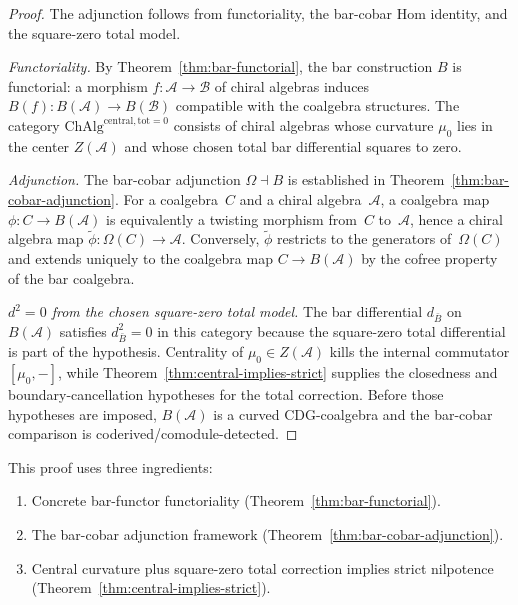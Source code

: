 \begin{proof}
The adjunction follows from functoriality, the bar-cobar Hom identity,
and the square-zero total model.

\emph{Functoriality.}
By Theorem~\ref{thm:bar-functorial}, the bar construction $B$ is functorial: a morphism $f: \mathcal{A} \to \mathcal{B}$ of chiral algebras induces $B(f): B(\mathcal{A}) \to B(\mathcal{B})$ compatible with the coalgebra structures. The category $\mathrm{ChAlg}^{\mathrm{central,tot=0}}$ consists of chiral algebras whose curvature $\mu_0$ lies in the center $Z(\mathcal{A})$ and whose chosen total bar differential squares to zero.

\emph{Adjunction.}
The bar-cobar adjunction $\Omega \dashv B$ is established in
Theorem~\ref{thm:bar-cobar-adjunction}. For a coalgebra~$C$ and a
chiral algebra~$\mathcal{A}$, a coalgebra map
$\phi\colon C \to B(\mathcal{A})$ is equivalently a twisting morphism
from~$C$ to~$\mathcal{A}$, hence a chiral algebra map
$\tilde{\phi}\colon \Omega(C) \to \mathcal{A}$. Conversely,
$\tilde{\phi}$ restricts to the generators of~$\Omega(C)$ and extends
uniquely to the coalgebra map $C \to B(\mathcal{A})$ by the cofree
property of the bar coalgebra.

\emph{$d^2 = 0$ from the chosen square-zero total model.}
The bar differential $d_{\bar{B}}$ on $B(\mathcal{A})$ satisfies
$d_{\bar{B}}^2 = 0$ in this category because the square-zero total
differential is part of the hypothesis. Centrality of
$\mu_0 \in Z(\mathcal{A})$ kills the internal commutator
$[\mu_0,-]$, while Theorem~\ref{thm:central-implies-strict} supplies
the closedness and boundary-cancellation hypotheses for the total
correction. Before those hypotheses are imposed, $B(\mathcal{A})$ is
a curved CDG-coalgebra and the bar-cobar comparison is
coderived/comodule-detected.
\end{proof}

\begin{remark}[Dependencies]
This proof uses three ingredients:
\begin{enumerate}[label=(D\arabic*)]
\item Concrete bar-functor functoriality (Theorem~\ref{thm:bar-functorial}).
\item The bar-cobar adjunction framework (Theorem~\ref{thm:bar-cobar-adjunction}).
\item Central curvature plus square-zero total correction implies strict nilpotence (Theorem~\ref{thm:central-implies-strict}).
\end{enumerate}
\end{remark}

